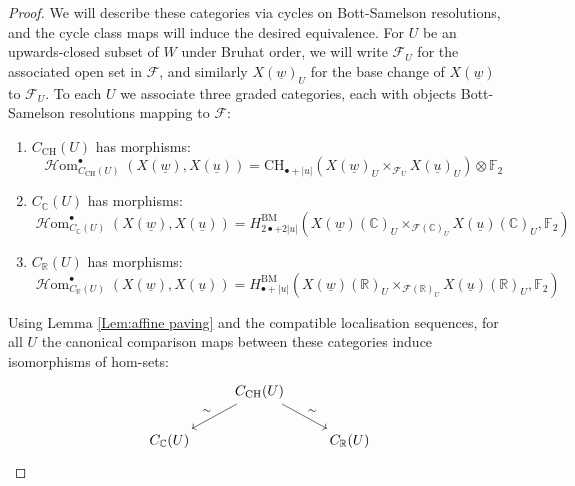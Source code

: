 \documentclass{amsart}
\theoremstyle{definition}
\theoremstyle{remark}
\DeclareMathOperator{\Hom}{\mathcal{H}om}
\begin{document}
\begin{proof}
We will describe these categories via cycles on Bott-Samelson resolutions, and the cycle class maps will induce the desired equivalence. For $U$ be an upwards-closed subset of $W$ under Bruhat order, we will write $\mathscr{F}_U$ for the associated open set in $\mathscr{F}$, and similarly $X(\underline{w})_U$ for the base change of $X(\underline{w})$ to $\mathscr{F}_U$. To each $U$ we associate three graded categories, each with objects Bott-Samelson resolutions mapping to $\mathscr{F}$:
\begin{enumerate}
    \item $C_{\mathrm{CH}}(U)$ has morphisms: \[\Hom^\bullet_{C_{\mathrm{CH}}(U)}(X(\underline{w}),X(\underline{u}))=\text{CH}_{\bullet+|u|}(X(\underline{w})_U\times_{\mathscr{F}_U}X(\underline{u})_U)\otimes \mathbb{F}_2\]
    \item 
    $C_{\mathbb{C}}(U)$ has morphisms: \[\Hom^\bullet_{C_{\mathbb{C}}(U)}(X(\underline{w}),X(\underline{u}))=H^{\textrm{BM}}_{2\bullet+2|u|}(X(\underline{w})(\mathbb{C})_U\times_{\mathscr{F}(\mathbb{C})_U}X(\underline{u})(\mathbb{C})_U,\mathbb{F}_2)\]
    \item $C_{\mathbb{R}}(U)$ has morphisms: \[\Hom^\bullet_{C_{\mathbb{R}}(U)}(X(\underline{w}),X(\underline{u}))=H^{\textrm{BM}}_{\bullet+|u|}(X(\underline{w})(\mathbb{R})_U\times_{\mathscr{F}(\mathbb{R})_U}X(\underline{u})(\mathbb{R})_U,\mathbb{F}_2)\]
\end{enumerate}

Using Lemma \ref{Lem:affine paving} and the compatible localisation sequences, for all $U$ the canonical comparison maps between these categories induce isomorphisms of hom-sets:
\[\begin{tikzcd}
    &C_{\mathrm{CH}}(U)\arrow[dl,"\sim"']\arrow[dr,"\sim"]&\\
    C_{\mathbb{C}}(U)&&C_{\mathbb{R}}(U)
\end{tikzcd}\]


\end{proof}
\end{document}
